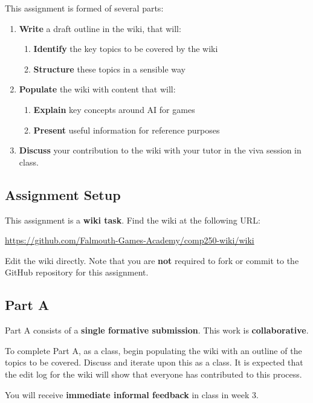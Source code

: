 \documentclass{../../fal_assignment}
\begin{document}
This assignment is formed of several parts:

\begin{enumerate}[label=(\Alph*)]
    \item \textbf{Write} a draft outline in the wiki, that will:
    	\begin{enumerate}[label=(\roman*)]
    		\item \textbf{Identify} the key topics to be covered by the wiki
    		\item \textbf{Structure} these topics in a sensible way
    	\end{enumerate}
    \item \textbf{Populate} the wiki with content that will:
    	\begin{enumerate}[label=(\roman*)]
    		\item \textbf{Explain} key concepts around AI for games
    		\item \textbf{Present} useful information for reference purposes
    	\end{enumerate}
    \item \textbf{Discuss} your contribution to the wiki with your tutor in the viva session in class.
\end{enumerate}

\subsection*{Assignment Setup}

This assignment is a \textbf{wiki task}. Find the wiki at the following URL:

\indent \url{https://github.com/Falmouth-Games-Academy/comp250-wiki/wiki}

Edit the wiki directly. Note that you are \textbf{not} required to fork or commit to the GitHub repository
for this assignment.

\subsection*{Part A}

Part A consists of a \textbf{single formative submission}. This work is \textbf{collaborative}.

To complete Part A, as a class, begin populating the wiki with an outline of the topics to be covered.
Discuss and iterate upon this as a class.
It is expected that the edit log for the wiki will show that everyone has contributed to this process.

You will receive \textbf{immediate informal feedback} in class in week 3.
\end{document}
